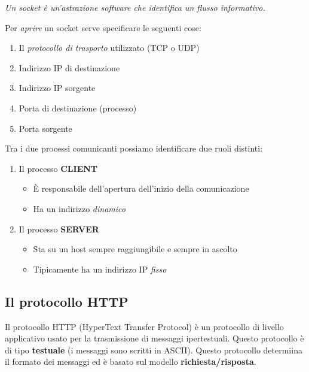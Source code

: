 \documentclass[a4paper]{article}
\begin{document}
\begin{definition}
\textit{Un socket è un'astrazione software che identifica un flusso informativo.}

Per \textit{aprire} un socket serve specificare le seguenti cose:
\begin{enumerate}
    \item Il \textit{protocollo di trasporto} utilizzato (TCP o UDP)
    \item Indirizzo IP di destinazione
    \item Indirizzo IP sorgente
    \item Porta di destinazione (processo)
    \item Porta sorgente 
\end{enumerate}
\end{definition}
Tra i due processi comunicanti possiamo identificare due ruoli distinti: 
\begin{enumerate}
    \item Il processo \textbf{CLIENT} \begin{itemize}
        \item È responsabile dell'apertura dell'inizio della comunicazione
        \item Ha un indirizzo \textit{dinamico}
    \end{itemize}
    \item Il processo \textbf{SERVER} \begin{itemize}
        \item Sta su un host sempre raggiungibile e sempre in ascolto
        \item Tipicamente ha un indirizzo IP \textit{fisso}
    \end{itemize}
\end{enumerate}

\subsection{Il protocollo HTTP}

Il protocollo HTTP (HyperText Transfer Protocol) è un protocollo di livello applicativo usato per la trasmissione di messaggi ipertestuali. Questo protocollo è di tipo \textbf{testuale} (i messaggi sono scritti in ASCII). Questo protocollo determiina il formato dei messaggi ed è basato sul modello \textbf{richiesta/risposta}.
\end{document}
